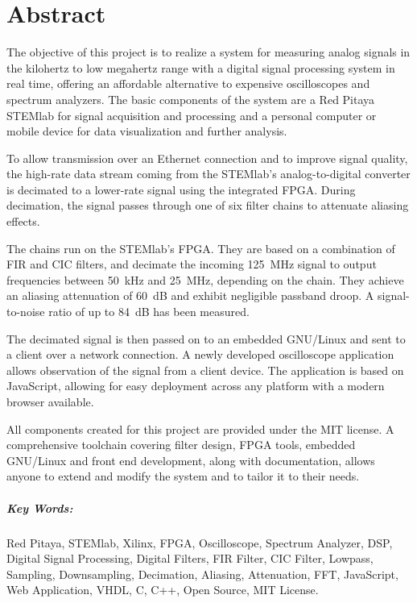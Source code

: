 %
%
\chapter*{Abstract} %
\label{ch:app:abstract}

The objective  of this  project is  to realize a  system for  measuring analog
signals  in  the kilohertz  to  low  megahertz  range  with a  digital  signal
processing  system  in  real  time,  offering  an  affordable  alternative  to
expensive oscilloscopes  and spectrum  analyzers. The basic components  of the
system are a  Red Pitaya STEMlab for signal acquisition  and processing  and a
personal  computer  or  mobile  device  for  data  visualization  and  further
analysis.

To  allow transmission  over  an  Ethernet connection  and  to improve  signal
quality, the high-rate data stream coming from the STEMlab's analog-to-digital
converter  is   decimated  to  a   lower-rate  signal  using   the  integrated
FPGA. During decimation, the signal passes through one of six filter chains to
attenuate aliasing  effects. 

The chains  run on  the STEMlab's  FPGA. They are based  on a  combination of
FIR  and CIC  filters,  and  decimate the  incoming  \SI{125}{\MHz} signal  to
output frequencies  between \SI{50}{\kHz} and \SI{25}{\MHz},  depending on the
chain. They  achieve  an  aliasing  attenuation of  \SI{60}{\dB}  and  exhibit
negligible passband droop. A  signal-to-noise ratio of up  to \SI{84}{\dB} has
been measured.

The decimated signal is then passed on  to an embedded GNU/Linux and sent to a
client over  a network connection. A newly  developed oscilloscope application
allows observation  of the signal  from a  client device.  The  application is
based on JavaScript,  allowing for easy deployment across any  platform with a
modern browser available.

All components created for this project  are provided under the MIT license. A
comprehensive toolchain covering filter design, FPGA tools, embedded GNU/Linux
and front end  development, along with documentation, allows  anyone to extend
and modify the system and to tailor it to their needs.

\vfill

\paragraph{Key Words:} 
Red Pitaya,
STEMlab,
Xilinx,
FPGA,
Oscilloscope,
Spectrum Analyzer,
DSP,
Digital Signal Processing,
Digital Filters,
FIR Filter,
CIC Filter,
Lowpass,
Sampling,
Downsampling,
Decimation,
Aliasing,
Attenuation,
FFT,
JavaScript,
Web Application,
VHDL,
C,
C++,
Open Source,
MIT License.
